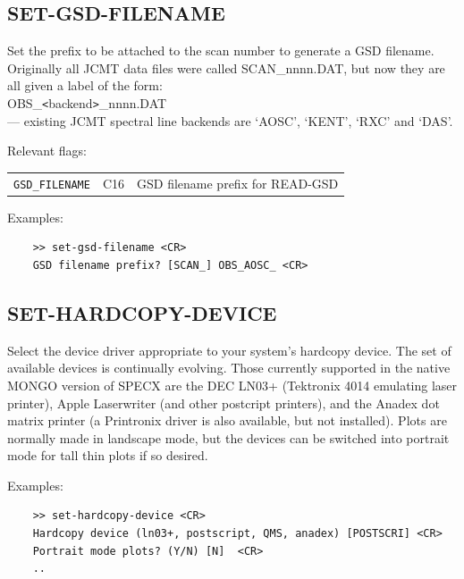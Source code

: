 \documentclass[11pt,twoside]{report}
\begin{document}
\subsection{SET-GSD-FILENAME} 

Set the prefix to be attached to the scan number to generate a GSD filename.
Originally all JCMT data files were called SCAN\_nnnn.DAT, but now they are all
given a label of the form:\\
\hspace*{2in} OBS\_\verb+<+backend\verb+>+\_nnnn.DAT \\
 --- existing JCMT spectral line backends are
`AOSC', `KENT', `RXC' and `DAS'.  
 

Relevant flags:\\
\begin{tabular}{lll}
   \verb+GSD_FILENAME+  & C16 & GSD filename prefix for READ-GSD
\end{tabular}

Examples:
\begin{verbatim}
    >> set-gsd-filename <CR>
    GSD filename prefix? [SCAN_] OBS_AOSC_ <CR>
\end{verbatim}

\subsection{SET-HARDCOPY-DEVICE} 

Select the device driver appropriate to your
system's hardcopy device. The set of available devices is continually evolving.
Those currently supported in the native MONGO version of SPECX are the DEC
LN03+  (Tektronix 4014 emulating laser printer),
Apple Laserwriter (and other  postcript printers), and
the Anadex  dot matrix printer (a Printronix
driver is also available, but not installed). Plots are normally made in
landscape  mode, but the devices can be switched into
portrait mode  for tall thin plots if so desired.

Examples:
\begin{verbatim}
    >> set-hardcopy-device <CR>
    Hardcopy device (ln03+, postscript, QMS, anadex) [POSTSCRI] <CR>
    Portrait mode plots? (Y/N) [N]  <CR>
    ..
\end{verbatim}
\end{document}
